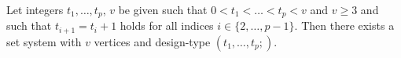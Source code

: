 Let integers $t_1, \ldots, t_p$, $v$ be given such that $0 < t_1 < \ldots < t_p < v$ and $v \geq 3$ and such that $t_{i+1} = t_i + 1$ holds for all indices $i \in \{2, \ldots, p - 1\}$. Then there exists a set system with $v$ vertices and design-type $(t_1, \ldots, t_p;)$.
